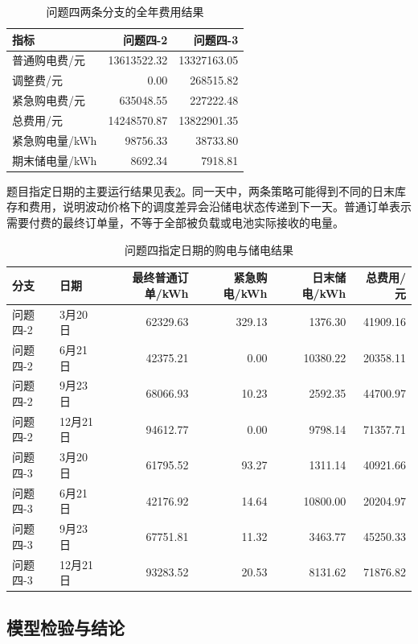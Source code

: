 \documentclass[11pt,a4paper]{article}
\begin{document}
\begin{table}[htbp]
\centering\small
\caption{问题四两条分支的全年费用结果}
\label{tab:q4result}
\begin{tabular}{lrr}
\toprule
指标 & 问题四-2 & 问题四-3 \\
\midrule
普通购电费/元 & 13613522.32 & 13327163.05 \\
调整费/元 & 0.00 & 268515.82 \\
紧急购电费/元 & 635048.55 & 227222.48 \\
总费用/元 & 14248570.87 & 13822901.35 \\
紧急购电量/kWh & 98756.33 & 38733.80 \\
期末储电量/kWh & 8692.34 & 7918.81 \\
\bottomrule
\end{tabular}
\end{table}

题目指定日期的主要运行结果见表\ref{tab:q4days}。同一天中，两条策略可能得到不同的日末库存和费用，说明波动价格下的调度差异会沿储电状态传递到下一天。普通订单表示需要付费的最终订单量，不等于全部被负载或电池实际接收的电量。

\begin{table}[htbp]
\centering\footnotesize
\caption{问题四指定日期的购电与储电结果}
\label{tab:q4days}
\begin{tabular}{llrrrr}
\toprule
分支 & 日期 & 最终普通订单/kWh & 紧急购电/kWh & 日末储电/kWh & 总费用/元 \\
\midrule
问题四-2 & 3月20日 & 62329.63 & 329.13 & 1376.30 & 41909.16 \\
问题四-2 & 6月21日 & 42375.21 & 0.00 & 10380.22 & 20358.11 \\
问题四-2 & 9月23日 & 68066.93 & 10.23 & 2592.35 & 44700.97 \\
问题四-2 & 12月21日 & 94612.77 & 0.00 & 9798.14 & 71357.71 \\
问题四-3 & 3月20日 & 61795.52 & 93.27 & 1311.14 & 40921.66 \\
问题四-3 & 6月21日 & 42176.92 & 14.64 & 10800.00 & 20204.97 \\
问题四-3 & 9月23日 & 67751.81 & 11.32 & 3463.77 & 45250.33 \\
问题四-3 & 12月21日 & 93283.52 & 20.53 & 8131.62 & 71876.82 \\
\bottomrule
\end{tabular}
\end{table}

\subsection{模型检验与结论}
\end{document}
